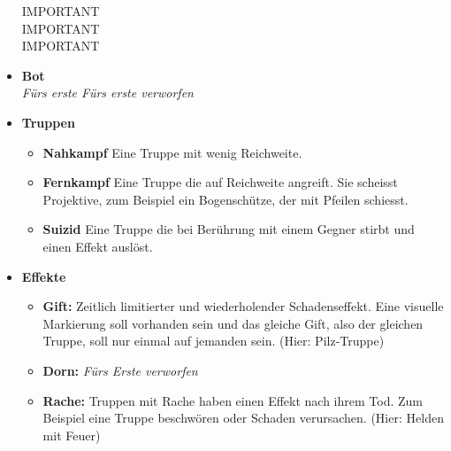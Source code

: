 \begin{itemize}
        IMPORTANT\\
        IMPORTANT\\
        IMPORTANT\\
    \item \textbf{Bot} \\
        \textit{Fürs erste Fürs erste verworfen}
    \item \textbf{Truppen}
    \begin{itemize}
        \item \textbf{Nahkampf}
            Eine Truppe mit wenig Reichweite.
        \item \textbf{Fernkampf}
            Eine Truppe die auf Reichweite angreift. Sie scheisst Projektive, zum Beispiel ein Bogenschütze,
            der mit Pfeilen schiesst.
        \item \textbf{Suizid}
            Eine Truppe die bei Berührung mit einem Gegner stirbt und einen Effekt auslöst.
    \end{itemize}
    \item \textbf{Effekte}
    \begin{itemize}
        \item \textbf{Gift:}
            Zeitlich limitierter und wiederholender Schadenseffekt. Eine visuelle Markierung soll vorhanden sein
            und das gleiche Gift, also der gleichen Truppe, soll nur einmal auf jemanden sein. (Hier: Pilz-Truppe)
        \item \textbf{Dorn:}
            \textit{Fürs Erste verworfen}
        \item \textbf{Rache:}
            Truppen mit Rache haben einen Effekt nach ihrem Tod. Zum Beispiel eine Truppe beschwören oder Schaden verursachen. (Hier: Helden mit Feuer)
    \end{itemize}
\end{itemize}

